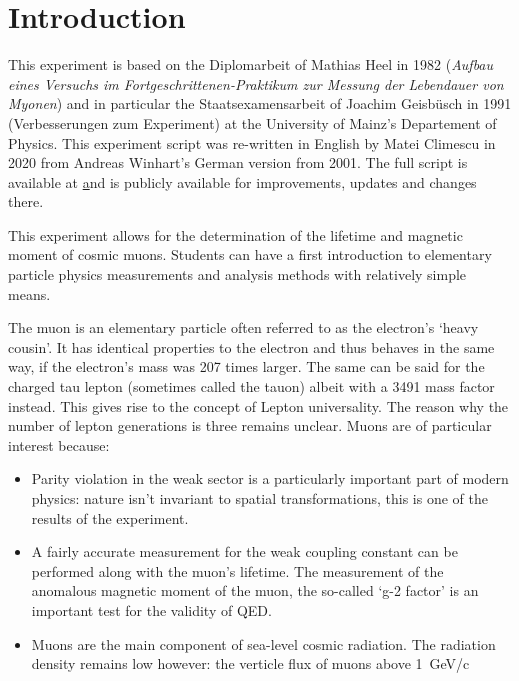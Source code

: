 
\chapter{Introduction}

This experiment is based on the Diplomarbeit of Mathias Heel in 1982 (\textit{Aufbau eines Versuchs im Fortgeschrittenen-Praktikum zur Messung der Lebendauer von Myonen}) and in particular the Staatsexamensarbeit of Joachim Geisb\"{u}sch in 1991 (Verbesserungen zum Experiment) at the University of Mainz's Departement of Physics. This experiment script was re-written in English by Matei Climescu in 2020 from Andreas Winhart's German version from 2001. The full script is available at \href{https://github.com/matclim/muonlifetime} and is publicly available for improvements, updates and changes there.



This experiment allows for the determination of the lifetime and magnetic moment of cosmic muons. Students can have a first introduction to elementary particle physics measurements and analysis methods with relatively simple means. 


The muon \Pmuon is an elementary particle often referred to as the electron's `heavy cousin'. It has identical properties to the electron and thus behaves in the same way, if the electron's mass was 207 times larger. The same can be said for the charged tau lepton \Ptauon (sometimes called the tauon) albeit with a 3491 mass factor instead. This gives rise to the concept of Lepton universality. The reason why the number of lepton generations is three remains unclear. Muons are of particular interest because:


\begin{itemize}
\item Parity violation in the weak sector is a particularly important part of modern physics: nature isn't invariant to spatial transformations, this is one of the results of the experiment.

\item A fairly accurate measurement for the weak coupling constant can be performed along with the muon's lifetime. The measurement of the anomalous magnetic moment of the muon, the so-called `g-2 factor' is an important test for the validity of QED.

\item Muons are the main component of sea-level cosmic radiation. The radiation density remains low however: the verticle flux of muons above \SI{1}{GeV/c}
\end{itemize}

